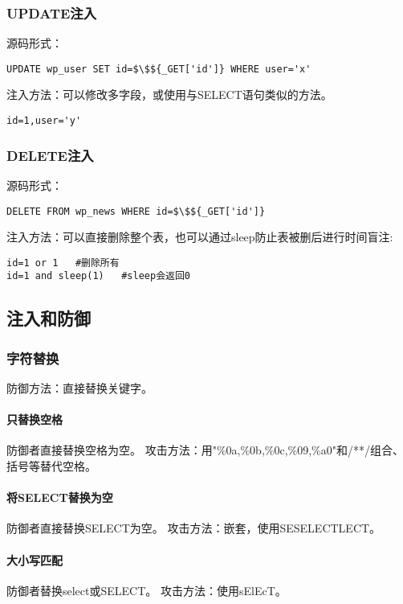 \subsubsection*{UPDATE注入}
源码形式：
\begin{lstlisting}
UPDATE wp_user SET id=$\$${_GET['id']} WHERE user='x'
\end{lstlisting}
注入方法：可以修改多字段，或使用与SELECT语句类似的方法。
\begin{lstlisting}
id=1,user='y'
\end{lstlisting}

\subsubsection*{DELETE注入}
源码形式：
\begin{lstlisting}
DELETE FROM wp_news WHERE id=$\$${_GET['id']}
\end{lstlisting}
注入方法：可以直接删除整个表，也可以通过sleep防止表被删后进行时间盲注:
\begin{lstlisting}
id=1 or 1   #删除所有
id=1 and sleep(1)   #sleep会返回0
\end{lstlisting}


\subsection{注入和防御}

\subsubsection*{字符替换}
防御方法：直接替换关键字。

\paragraph*{只替换空格}
防御者直接替换空格为空。
攻击方法：用"\%0a,\%0b,\%0c,\%09,\%a0"和/**/组合、括号等替代空格。

\paragraph*{将SELECT替换为空}
防御者直接替换SELECT为空。
攻击方法：嵌套，使用SESELECTLECT。

\paragraph*{大小写匹配}
防御者替换select或SELECT。
攻击方法：使用sElEcT。

